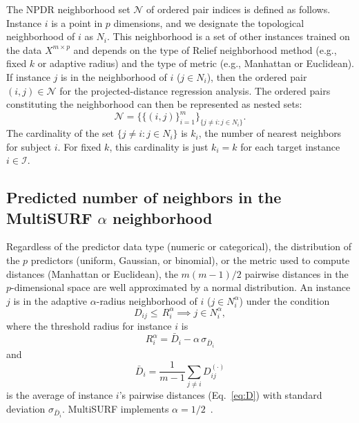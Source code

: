 \documentclass[10pt,letterpaper]{article}
\begin{document}
The NPDR neighborhood set $\mathcal{N}$ of ordered pair indices is defined as follows. Instance $i$ is a point in $p$ dimensions, and we designate the topological neighborhood of $i$ as $N_{i}$. This neighborhood is a set of other instances trained on the data $X^{m \times p}$ and depends on the type of Relief neighborhood method (e.g., fixed $k$ or adaptive radius) and the type of metric (e.g., Manhattan or Euclidean). If instance $j$ is in the neighborhood of $i$ ($j \in N_{i}$), then the ordered pair $(i,j) \in \mathcal{N}$ for the projected-distance regression analysis. The ordered pairs constituting the neighborhood can then be represented as nested sets:
\begin{equation}\label{eq:N}
\mathcal{N}=\{\{(i, j)\}_{i=1}^{m}\}_{\{j \ne i : j \in N_{i}\}}.
\end{equation}
The cardinality of the set $\{j \ne i : j \in N_{i}\}$ is $k_i$, the number of nearest neighbors for subject $i$. For fixed $k$, this cardinality is just $k_i = k$ for each target instance $i \in \mathcal{I}$.

\subsection{Predicted number of neighbors in the MultiSURF \texorpdfstring{$\alpha$}{} neighborhood}

Regardless of the predictor data type (numeric or categorical), the distribution of the $p$ predictors (uniform, Gaussian, or binomial), or the metric used to compute distances (Manhattan or Euclidean), the $m(m-1)/2$ pairwise distances in the $p$-dimensional space are well approximated by a normal distribution. An instance $j$ is in the adaptive $\alpha$-radius neighborhood of $i$ ($j \in N^{\alpha}_{i}$) under the condition
%
%
\begin{equation}
D_{ij} \le \, R_i^{\alpha} \implies j \in N^{\alpha}_{i},
\end{equation}
where the threshold radius for instance $i$ is
\begin{equation}
R_i^{\alpha} =  \bar{D}_i - \alpha \, \sigma_{\bar{D}_i}
\end{equation}
and
\begin{equation}
\bar{D}_i = \frac{1}{m-1} \sum_{j \ne i} D^{(\cdot)}_{ij}
\end{equation}
is the average of instance $i$'s pairwise distances (Eq.~\ref{eq:D}) with standard deviation $\sigma_{\bar{D}_i}$. MultiSURF implements $\alpha=1/2$~\cite{urbanowicz17}.
\end{document}
